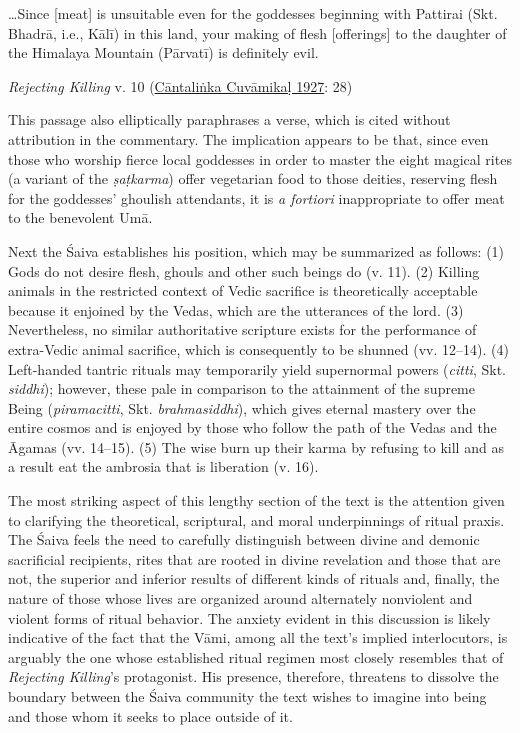 \begin{pullquote}


	
	    …Since [meat] is unsuitable even for the goddesses beginning with Pattirai (Skt. Bhadrā, i.e., Kālī) in this land, your making of flesh [offerings] to the daughter of the Himalaya Mountain (Pārvatī) is definitely evil.
	  \\


\medskip\hfill\begin{minipage}{0.9\textwidth}\small\hfill
\emph{Rejecting Killing} v. 10 (\hyperref[CantalinkaCuvamikal1927]{Cāntaliṅka Cuvāmikaḷ 1927}: 28)\end{minipage}\hspace{2em}
\end{pullquote}

This passage also elliptically paraphrases a verse, which is cited without attribution in the commentary. The implication appears to be that, since even those who worship fierce local goddesses in order to master the eight magical rites (a variant of the \emph{ṣaṭkarma}) offer vegetarian food to those deities, reserving flesh for the goddesses’ ghoulish attendants, it is \emph{a fortiori} inappropriate to offer meat to the benevolent Umā.


Next the Śaiva establishes his position, which may be summarized as follows: (1) Gods do not desire flesh, ghouls and other such beings do (v. 11). (2) Killing animals in the restricted context of Vedic sacrifice is theoretically acceptable because it enjoined by the Vedas, which are the utterances of the lord. (3) Nevertheless, no similar authoritative scripture exists for the performance of extra-Vedic animal sacrifice, which is consequently to be shunned (vv. 12–14). (4) Left-handed tantric rituals may temporarily yield supernormal powers (\emph{citti}, Skt. \emph{siddhi}); however, these pale in comparison to the attainment of the supreme Being (\emph{piramacitti}, Skt. \emph{brahmasiddhi}), which gives eternal mastery over the entire cosmos and is enjoyed by those who follow the path of the Vedas and the Āgamas (vv. 14–15). (5) The wise burn up their karma by refusing to kill and as a result eat the ambrosia that is liberation (v. 16).


The most striking aspect of this lengthy section of the text is the attention given to clarifying the theoretical, scriptural, and moral underpinnings of ritual praxis. The Śaiva feels the need to carefully distinguish between divine and demonic sacrificial recipients, rites that are rooted in divine revelation and those that are not, the superior and inferior results of different kinds of rituals and, finally, the nature of those whose lives are organized around alternately nonviolent and violent forms of ritual behavior. The anxiety evident in this discussion is likely indicative of the fact that the Vāmi, among all the text’s implied interlocutors, is arguably the one whose established ritual regimen most closely resembles that of \emph{Rejecting Killing}’s protagonist. His presence, therefore, threatens to dissolve the boundary between the Śaiva community the text wishes to imagine into being and those whom it seeks to place outside of it.


